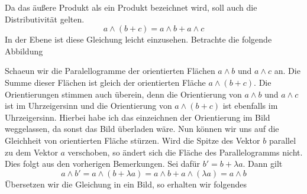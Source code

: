 \documentclass[fleqn]{scrartcl}
\numberwithin{equation}{section}
\begin{document}
Da das äußere Produkt als ein Produkt bezeichnet wird, soll auch die
Distributivität gelten.
\[a\wedge (b + c) = a\wedge b + a\wedge c\]
In der Ebene ist diese Gleichung leicht einzusehen. Betrachte die folgende
Abbildung
\begin{center}
\begin{minipage}{\linewidth}
\centering
{}
\label{fig:distributivity}
\end{minipage}
\end{center}
Schaeun wir die Paralellogramme der orientierten Flächen $a\wedge b$ und
$a\wedge c$ an. Die Summe dieser Flächen ist gleich der orientierten Fläche
$a\wedge(b+c)$. Die Orientierungen stimmen auch überein, denn die Orientierung
von $a\wedge b$ und $a\wedge c$ ist im Uhrzeigersinn und die Orientierung von
$a\wedge(b+c)$ ist ebenfalls im Uhrzeigersinn. Hierbei habe ich das
einzeichnen der Orientierung im Bild weggelassen, da sonst das Bild überladen
wäre.
\newpage
Nun können wir uns auf die Gleichheit von orientierten Fläche stürzen. Wird
die Spitze des Vektor $b$ parallel zu dem Vektor $a$ verschoben, so ändert
sich die Fläche des Parallelogramms nicht. Dies folgt aus den vorherigen
Bemerkungen. Sei dafür $b'= b + \lambda a$. Dann gilt
\[a\wedge b' = a\wedge (b + \lambda a) = a \wedge b + a\wedge (\lambda a)=
a\wedge b\]
Übersetzen wir die Gleichung in ein Bild, so erhalten wir folgendes
\end{document}
